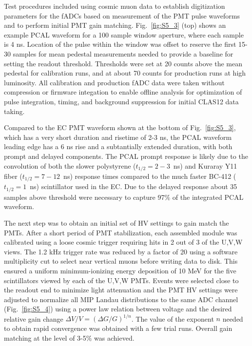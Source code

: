 Test procedures included using cosmic muon data to establish digitization parameters for the fADCs based on measurement of the PMT pulse waveforms and to perform initial PMT gain matching.  Fig.~\ref{fig:S5_3} (top) shows an example PCAL waveform for a 100 sample window aperture, where each sample is 4 ns.  Location of the pulse within the window was offset to reserve the first 15-30 samples for mean pedestal measurements needed to provide a baseline for setting the readout threshold.  Thresholds were set at 20 counts above the mean pedestal for calibration runs, and at about 70 counts for production runs at high luminosity.  All calibration and production fADC data were taken without compression or firmware integation to enable offline analysis for optimization of pulse integration, timing, and background suppression for initial CLAS12 data taking.

Compared to the EC PMT waveform shown at the bottom of Fig.~\ref{fig:S5_3}, which has a very short duration and risetime of 2-3 ns, the PCAL waveform leading edge has a 6 ns rise and a subtantially extended duration, with both prompt and delayed components.  The PCAL prompt response is likely due to the convolution of both the slower polystyrene ($t_{1/2}=2-3$~ns) and Kuraray Y11 fiber ($t_{1/2}=7-12$~ns) response times compared to the much faster BC-412 ($t_{1/2}=1$~ns) scintillator used in the EC.  Due to the delayed response about 35 samples above threshold were necessary to capture 97$\%$ of the integrated PCAL waveform.  

The next step was to obtain an initial set of HV settings to gain match the PMTs.  After a short period of PMT stabilization, each assembled module was calibrated using a loose cosmic trigger requiring hits in 2 out of 3 of the U,V,W views.  The 1.2 kHz trigger rate was reduced by a factor of 20 using a software multiplicity cut to select near vertical muons before writing data to disk.  This ensured a uniform minimum-ionizing energy deposition of 10 MeV for the five scintillators viewed by each of the U,V,W PMTs. Events were selected close to the readout end to minimize light attenuation and the PMT HV settings were adjusted to normalize all MIP Landau distributions to the same ADC channel (Fig.~\ref{fig:S5_4}) using a power law relation between voltage and the desired relative gain change $\Delta V/V = (\Delta G/G)^{1/n}$.  The value of the exponent $n$ needed to obtain rapid convergence was obtained with a few trial runs.  Overall gain matching at the level of 3-5$\%$ was achieved.

